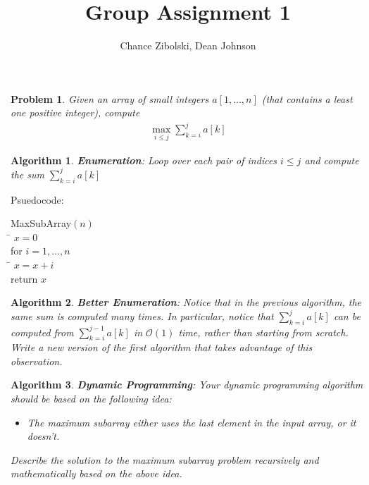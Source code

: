 \documentclass{article}
\title{Group Assignment 1}
\author{Chance Zibolski, Dean Johnson}
\newtheorem{problem}{Problem}
\newtheorem{algorithm}{Algorithm}
\begin{document}
\maketitle

\begin{problem}
Given an array of small integers $a[1,\ldots,n]$ (that contains a least one
positive integer), compute
\begin{eqnarray*}
  \label{MaxSubArray}
  \max_{i \leq j}\sum_{k=i}^{j}a[k]
\end{eqnarray*}
\end{problem}

\begin{algorithm}
\textbf{Enumeration}: Loop over each pair of indices $ i \leq j $ and
compute the sum $\sum_{k=i}^{j}a[k]$
\end{algorithm}

Psuedocode:

\begin{tabbing}
  {\sc MaxSubArray}$(n)$\\
  \qquad \= $x = 0$ \\
  \> for $i = 1, \ldots, n$\\
  \> \qquad \= $x = x+i$\\
  \> return $x$
\end{tabbing}


\begin{algorithm}
\textbf{Better Enumeration}: Notice that in the previous algorithm,  the
same sum is computed many times.  In particular, notice that
$\sum_{k=i}^{j}a[k]$ can be computed from $\sum_{k=i}^{j-1}a[k]$ in
$\mathcal{O}(1)$ time, rather than starting from scratch. Write a new version
of the first algorithm that takes advantage of this observation.

\end{algorithm}

\begin{algorithm}
\textbf{Dynamic Programming}: Your dynamic programming algorithm should be
based on the following idea:

\begin{itemize}
\item The maximum subarray either uses the last element in the input array,
or it doesn't.
\end{itemize}

Describe the solution to the maximum subarray problem recursively and
mathematically based on the above idea.

\end{algorithm}
\end{document}
